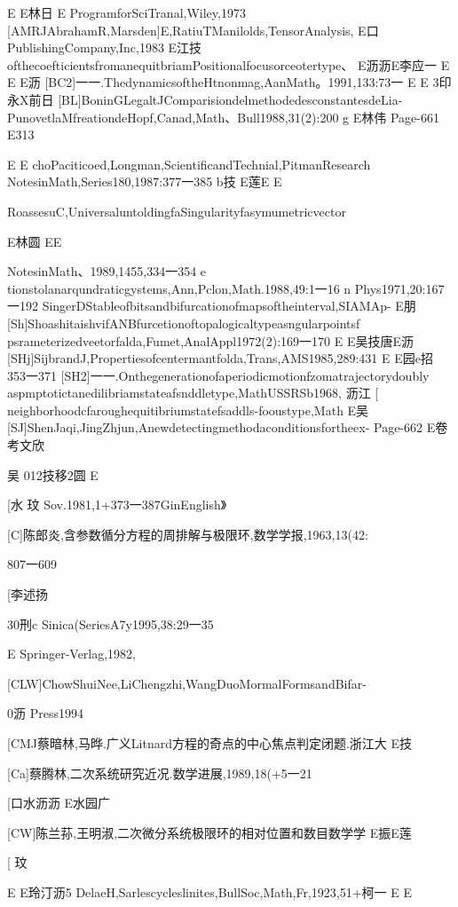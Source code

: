 E
E林日
E
ProgramforSciTranal,Wiley,1973
[AMRJAbrahamR,Marsden]E,RatiuTManilolds,TensorAnalysis,
E口
PublishingCompany,Inc,1983
E江技
ofthecoefticientsfromanequitbriamPositionalfocusorceotertype、
E沥沥E李应一
E
E
E沥
[BC2]一一.ThedynamicsoftheHtnonmag,AanMath。1991,133:73一
E
E
3印永X前日
[BL]BoninGLegaltJComparisiondelmethodedesconstantesdeLia-
PunovetlaMfreationdeHopf,Canad,Math、Bull1988,31(2):200
g
E林伟
Page-661
E313

E
E
choPaciticoed,Longman,ScientificandTechnial,PitmanResearch
NotesinMath,Series180,1987:377一385
b技
E莲E
E

RoassesuC,UniversaluntoldingfaSingularityfasymumetricvector

E林圆
EE

NotesinMath、1989,1455,334一354
e
tionstolanarqundraticgystems,Ann,Pclon,Math.1988,49:1一16
n
Phys1971,20:167一192
SingerDStableofbitsandbifurcationofmapsoftheinterval,SIAMAp-
E朋
[Sh]ShoashitaishvifANBfurcetionoftopalogicaltypeasngularpointsf
psrameterizedveetorfalda,Fumet,AnalAppl1972(2):169一170
E
E吴技唐E沥
[SHj]SijbrandJ,Propertiesofcentermantfolda,Trans,AMS1985,289:431
E
E园e招
353一371
[SH2]一一.Onthegenerationofaperiodicmotionfzomatrajectorydoubly
aspmptotictanedilibriamstateafsnddletype,MathUSSRSb1968,
沥江
[
neighborhoodcfaroughequitibriumstatefsaddls-fooustype,Math
E吴
[SJ]ShenJaqi,JingZhjun,Anewdetectingmethodaconditionsfortheex-
Page-662
E卷考文欣

吴
012技移2圆
E

[水
玟
Sov.1981,1+373一387GinEnglish》

[C]陈郎炎,含参数循分方程的周排解与极限环,数学学报,1963,13(42:

807一609

[李述扬

30刑c
Sinica(SeriesA7y1995,38:29一35

E
Springer-Verlag,1982,

[CLW]ChowShuiNee,LiChengzhi,WangDuoMormalFormsandBifar-

0沥
Press1994

[CMJ蔡暗林,马晔.广义Litnard方程的奇点的中心焦点判定闭题.浙江大
E技

[Ca]蔡腾林,二次系统研究近况.数学进展,1989,18(+5一21

[口水沥沥
E水园广

[CW]陈兰荪,王明淑,二次微分系统极限环的相对位置和数目数学学
E振E莲

[
玟

E
E玲汀沥5
DelaeH,Sarlescycleslinites,BullSoc,Math,Fr,1923,51+柯一
E
E

